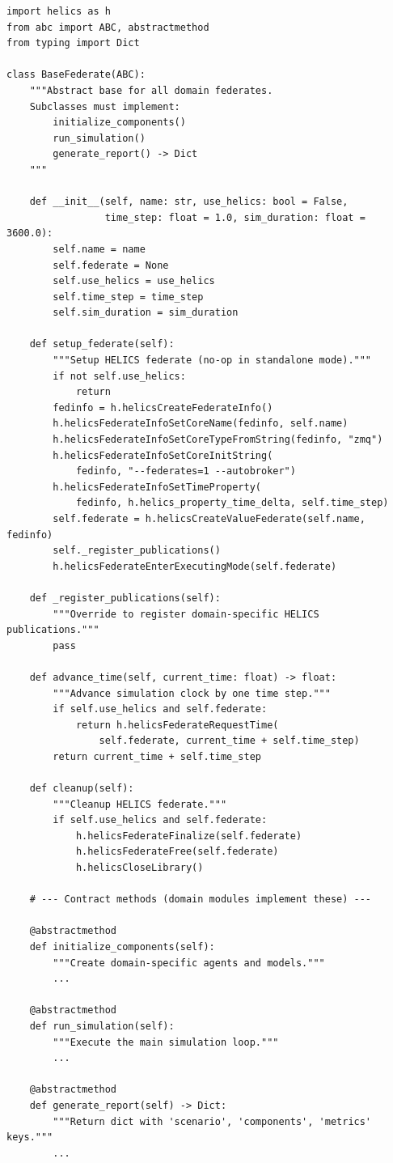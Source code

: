\begin{listing}[H]
\begin{verbatim}
import helics as h
from abc import ABC, abstractmethod
from typing import Dict

class BaseFederate(ABC):
    """Abstract base for all domain federates.
    Subclasses must implement:
        initialize_components()
        run_simulation()
        generate_report() -> Dict
    """

    def __init__(self, name: str, use_helics: bool = False,
                 time_step: float = 1.0, sim_duration: float = 3600.0):
        self.name = name
        self.federate = None
        self.use_helics = use_helics
        self.time_step = time_step
        self.sim_duration = sim_duration

    def setup_federate(self):
        """Setup HELICS federate (no-op in standalone mode)."""
        if not self.use_helics:
            return
        fedinfo = h.helicsCreateFederateInfo()
        h.helicsFederateInfoSetCoreName(fedinfo, self.name)
        h.helicsFederateInfoSetCoreTypeFromString(fedinfo, "zmq")
        h.helicsFederateInfoSetCoreInitString(
            fedinfo, "--federates=1 --autobroker")
        h.helicsFederateInfoSetTimeProperty(
            fedinfo, h.helics_property_time_delta, self.time_step)
        self.federate = h.helicsCreateValueFederate(self.name, fedinfo)
        self._register_publications()
        h.helicsFederateEnterExecutingMode(self.federate)

    def _register_publications(self):
        """Override to register domain-specific HELICS publications."""
        pass

    def advance_time(self, current_time: float) -> float:
        """Advance simulation clock by one time step."""
        if self.use_helics and self.federate:
            return h.helicsFederateRequestTime(
                self.federate, current_time + self.time_step)
        return current_time + self.time_step

    def cleanup(self):
        """Cleanup HELICS federate."""
        if self.use_helics and self.federate:
            h.helicsFederateFinalize(self.federate)
            h.helicsFederateFree(self.federate)
            h.helicsCloseLibrary()

    # --- Contract methods (domain modules implement these) ---

    @abstractmethod
    def initialize_components(self):
        """Create domain-specific agents and models."""
        ...

    @abstractmethod
    def run_simulation(self):
        """Execute the main simulation loop."""
        ...

    @abstractmethod
    def generate_report(self) -> Dict:
        """Return dict with 'scenario', 'components', 'metrics' keys."""
        ...
\end{verbatim}
\caption{\texttt{engine/base.py} --- Domain-agnostic simulation engine (complete)}
\label{lst:app-base-federate}
\end{listing}

